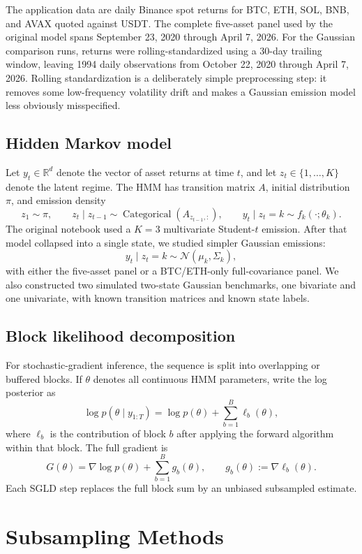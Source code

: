 \documentclass{article}
\newcommand{\R}{\mathbb{R}}
\newcommand{\1}{\mathbf{1}}
\begin{document}
The application data are daily Binance spot returns for BTC, ETH, SOL, BNB, and AVAX quoted against USDT. The complete five-asset panel used by the original model spans September 23, 2020 through April 7, 2026. For the Gaussian comparison runs, returns were rolling-standardized using a 30-day trailing window, leaving 1994 daily observations from October 22, 2020 through April 7, 2026. Rolling standardization is a deliberately simple preprocessing step: it removes some low-frequency volatility drift and makes a Gaussian emission model less obviously misspecified.

\subsection{Hidden Markov model}

Let $y_t \in \R^d$ denote the vector of asset returns at time $t$, and let $z_t \in \{1,\dots,K\}$ denote the latent regime. The HMM has transition matrix $A$, initial distribution $\pi$, and emission density
\[
  z_1 \sim \pi,\qquad
  z_t \mid z_{t-1} \sim \operatorname{Categorical}(A_{z_{t-1},:}),\qquad
  y_t \mid z_t=k \sim f_k(\cdot;\theta_k).
\]
The original notebook used a $K=3$ multivariate Student-$t$ emission. After that model collapsed into a single state, we studied simpler Gaussian emissions:
\[
  y_t \mid z_t=k \sim \mathcal{N}(\mu_k,\Sigma_k),
\]
with either the five-asset panel or a BTC/ETH-only full-covariance panel. We also constructed two simulated two-state Gaussian benchmarks, one bivariate and one univariate, with known transition matrices and known state labels.

\subsection{Block likelihood decomposition}

For stochastic-gradient inference, the sequence is split into overlapping or buffered blocks. If $\theta$ denotes all continuous HMM parameters, write the log posterior as
\[
  \log p(\theta \mid y_{1:T}) =
  \log p(\theta) + \sum_{b=1}^B \ell_b(\theta),
\]
where $\ell_b$ is the contribution of block $b$ after applying the forward algorithm within that block. The full gradient is
\[
  G(\theta) = \nabla \log p(\theta) + \sum_{b=1}^B g_b(\theta),
  \qquad g_b(\theta) := \nabla \ell_b(\theta).
\]
Each SGLD step replaces the full block sum by an unbiased subsampled estimate.

\section{Subsampling Methods}
\end{document}

